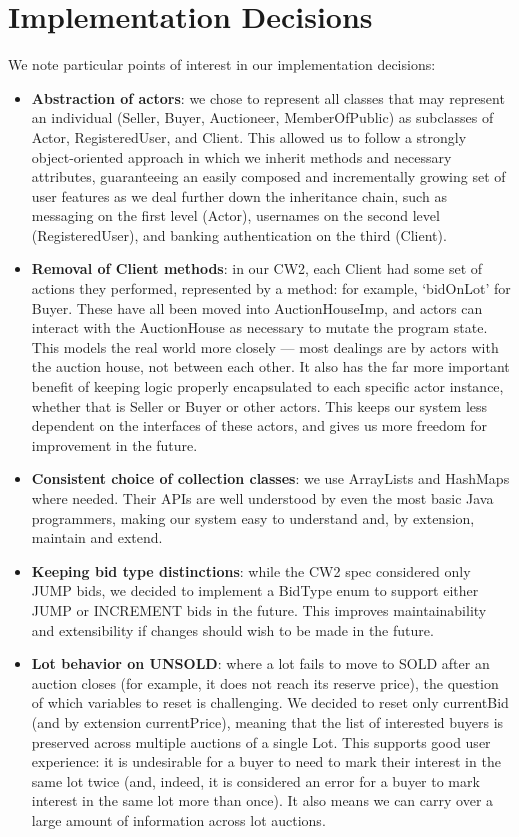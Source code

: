 \documentclass[titlepage, 12pt]{extarticle}
\begin{document}
\section{Implementation Decisions}
We note particular points of interest in our implementation decisions:
\begin{itemize}
    \item {\bf Abstraction of actors}: we chose to represent all classes that may represent an individual (Seller, Buyer, Auctioneer, MemberOfPublic) as subclasses of Actor, RegisteredUser, and Client. This allowed us to follow a strongly object-oriented approach in which we inherit methods and necessary attributes, guaranteeing an easily composed and incrementally growing set of user features as we deal further down the inheritance chain, such as messaging on the first level (Actor), usernames on the second level (RegisteredUser), and banking authentication on the third (Client).
    \item {\bf Removal of Client methods}: in our CW2, each Client had some set
        of actions they performed, represented by a method: for example,
        `bidOnLot' for Buyer. These have all been moved into AuctionHouseImp, and actors can interact with the AuctionHouse as necessary to mutate the program state. This models the real world more closely --- most dealings are by actors with the auction house, not between each other. It also has the far more important benefit of keeping logic properly encapsulated to each specific actor instance, whether that is Seller or Buyer or other actors. This keeps our system less dependent on the interfaces of these actors, and gives us more freedom for improvement in the future.
    \item {\bf Consistent choice of collection classes}: we use ArrayLists and
      HashMaps where needed. Their APIs are well understood by even the most basic Java programmers, making our system easy to understand and, by extension, maintain and extend.
    \item {\bf Keeping bid type distinctions}: while the CW2 spec considered only JUMP bids, we decided to implement a BidType enum to support either JUMP or INCREMENT bids in the future. This improves maintainability and extensibility if changes should wish to be made in the future. 
    \item {\bf Lot behavior on UNSOLD}: where a lot fails to move to SOLD after an auction closes (for example, it does not reach its reserve price), the question of which variables to reset is challenging. We decided to reset only currentBid (and by extension currentPrice), meaning that the list of interested buyers is preserved across multiple auctions of a single Lot. This supports good user experience: it is undesirable for a buyer to need to mark their interest in the same lot twice (and, indeed, it is considered an error for a buyer to mark interest in the same lot more than once). It also means we can carry over a large amount of information across lot auctions.

\end{itemize}
\end{document}
